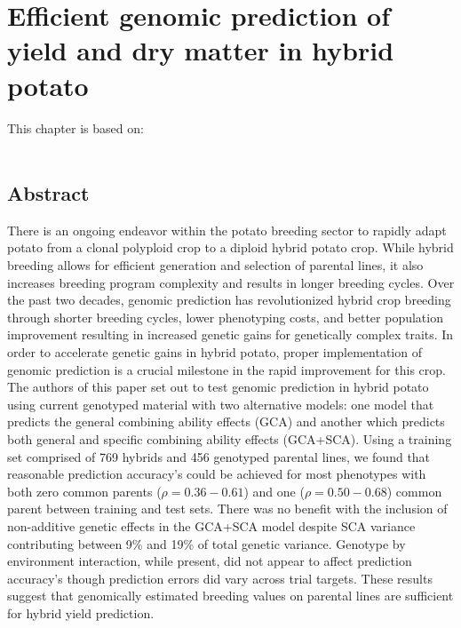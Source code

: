 \chapter[Efficient genomic prediction of yield and dry matter in hybrid potato]{Efficient genomic prediction of yield and dry matter in hybrid potato}

\label{cha:chapter3}
\vspace*{\fill}
This chapter is based on:
\\
\\
\newpage

\section*{Abstract}

There is an ongoing endeavor within the potato breeding sector to rapidly adapt potato from a clonal polyploid crop to a diploid hybrid potato crop.  While hybrid breeding allows for efficient generation and selection of parental lines, it also increases breeding program complexity and results in longer breeding cycles. Over the past two decades, genomic prediction has revolutionized hybrid crop breeding through shorter breeding cycles, lower phenotyping costs, and better population improvement resulting in increased genetic gains for genetically complex traits. In order to accelerate genetic gains in hybrid potato, proper implementation of genomic prediction is a crucial milestone in the rapid improvement for this crop. The authors of this paper set out to test genomic prediction in hybrid potato using current genotyped material with two alternative models: one model that predicts the general combining ability effects (GCA) and another which predicts both general and specific combining ability effects (GCA+SCA). Using a training set comprised of 769 hybrids and 456 genotyped parental lines, we found that reasonable prediction accuracy's could be achieved for most phenotypes with both zero common parents (\(\rho = 0.36 - 0.61\)) and one ($\rho = 0.50 - 0.68$) common parent between training and test sets. There was no benefit with the inclusion of non-additive genetic effects in the GCA+SCA model despite SCA variance contributing between 9\% and 19\% of total genetic variance. Genotype by environment interaction, while present, did not appear to affect prediction accuracy's though prediction errors did vary across trial targets. These results suggest that genomically estimated breeding values on parental lines are sufficient for hybrid yield prediction.


